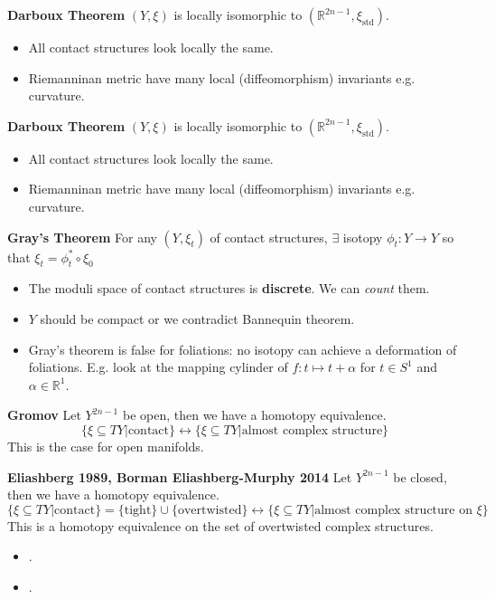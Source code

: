 \documentclass[12pt]{article}
\begin{document}
{\noindent \textbf{Darboux Theorem} $(Y, \xi)$ is locally isomorphic to $(\mathbb{R}^{2n-1}, \xi_\text{std})$.  
\begin{itemize}
	\item All contact structures look locally the same. 
	\item Riemanninan metric have many local (diffeomorphism) invariants e.g. curvature. 
\end{itemize}

\noindent \textbf{Darboux Theorem} $(Y, \xi)$ is locally isomorphic to $(\mathbb{R}^{2n-1}, \xi_\text{std})$.  
\begin{itemize}
	\item All contact structures look locally the same. 
	\item Riemanninan metric have many local (diffeomorphism) invariants e.g. curvature. 
\end{itemize}

\noindent \textbf{Gray's Theorem} For any $(Y, \xi_t)$ of contact structures, $\exists$ isotopy $\phi_t: Y \to Y$ so that $\xi_t = \phi_t^\ast \circ \xi_0$
\begin{itemize}
	\item The moduli space of contact structures is \textbf{discrete}.  We can \textit{count}  them.
	\item $Y$ should be compact or we contradict Bannequin theorem. 
	\item Gray's theorem is false for foliations: no isotopy can achieve a deformation of foliations.  E.g. look at the mapping cylinder of $f:t \mapsto t + \alpha$ for $t \in S^1$ and $\alpha \in \mathbb{R}^1$.
\end{itemize}

\noindent \textbf{Gromov} Let $Y^{2n-1}$ be open, then we have a homotopy equivalence.
$$ \{ \xi \subseteq TY | \text{contact} \}  \leftrightarrow \{ \xi \subseteq TY | \text{almost complex structure} \} $$
This is the case for open manifolds.

\noindent \textbf{Eliashberg 1989, Borman Eliashberg-Murphy 2014} \newline
Let $Y^{2n-1}$ be closed, then we have a homotopy equivalence.
$$ \{ \xi \subseteq TY | \text{contact} \}= \{ \text{tight}\} \cup  \{ \text{overtwisted}\} \longleftrightarrow \{ \xi \subseteq TY | \text{almost complex structure on }\xi \} $$
This is a homotopy equivalence on the set of overtwisted complex structures.
\begin{itemize}
	\item .
	\item .
\end{itemize}

}
\end{document}
